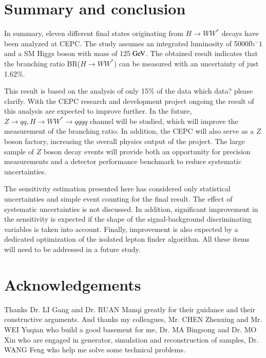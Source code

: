 \documentclass[11pt,a4paper]{cepcnote}
\begin{document}
%
%
\section{Summary and conclusion}
In summary, eleven different final states originating from 
$H\rightarrow WW^*$ decays have been analyzed at CEPC. The study assumes 
an integrated luminosity of 5000fb$^-1$ and a SM Higgs boson with mass 
of 125$\gev$. The obtained result indicates that the branching ratio 
BR($H\rightarrow WW^*$) can be measured with an uncertainty of just 1.62\%.

This result is based on the analysis of only 15\% of the data 
{\color{red} which data? please clarify}.
With the CEPC research and development project ongoing
the result of this analysis are expected to improve further.
In the future, $Z\rightarrow qq, H\rightarrow WW^*\rightarrow qqqq$ channel 
will be studied, which will improve the measurement of the branching ratio.
In addition, the CEPC will also serve as a $Z$ boson factory, increasing the
overall physics output of the project.
The large sample of $Z$ boson decay events will provide both an opportunity
for precision measurements and a detector performance benchmark to reduce 
systematic uncertainties.

The sensitivity  estimation presented here has considered only statistical
uncertainties and simple event counting for the final result.
The effect of systematic uncertainties is not discussed. In addition,
significant improvement in the sensitivity is expected 
if the shape of the signal-background
discriminating variables is taken into account. Finally, improvement is
also expected by a dedicated optimization of the isolated lepton finder
algorithm. All these items will need to be addressed in a future study.

%

\section{Acknowledgements}

Thanks Dr. LI Gang and Dr. RUAN Manqi greatly for their guidance and their constructive arguments.
And thanks my colleagues, Mr. CHEN Zhenxing and Mr. WEI Yuqian who build a good basement for me, 
Dr. MA Bingsong and Dr. MO Xin who are engaged in generator, simulation and reconstruction of samples, 
Dr. WANG Feng who help me solve some technical problems.
\end{document}
